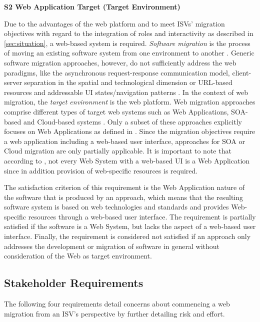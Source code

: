 \textbf{S2 Web Application Target (Target Environment)}

Due to the advantages of the web platform \autocite{Gitzel2007WebEngineeringMDD,Knorr2003WebAsPlatform} and to meet ISVs' migration objectives with regard to the integration of roles and interactivity as described in \cref{sec:situation}, a web-based system is required.
\emph{Software migration} is the process of moving an existing software system from one environment to another \autocite{SWEBOK2014}.
Generic software migration approaches, however, do not sufficiently address the web paradigms, like the asynchronous request-response communication model, client-server separation in the spatial and technological dimension or URL-based resources and addressable UI states/navigation patterns \autocite{Heil2017Survey}.
In the context of web migration, the \emph{target environment} is the web platform.
Web migration approaches comprise different types of target web systems \autocite[cf.~][]{def:websystem} such as Web Applications, SOA-based and Cloud-based systems \autocite{Heil2017Survey}.
Only a subset of these approaches explicitly focuses on Web Applications as defined in \autocite{def:webapplication}.
Since the migration objectives require a web application including a web-based user interface, approaches for SOA or Cloud migration are only partially applicable.
It is important to note that according to \autocite{def:webapplication}, not every Web System with a web-based UI is a Web Application since in addition provision of web-specific resources is required.

The satisfaction criterion of this requirement is the Web Application nature of the software that is produced by an approach, which means that the resulting software system is based on web technologies and standards and provides Web-specific resources through a web-based user interface.
The requirement is partially satisfied if the software is a Web System, but lacks the aspect of a web-based user interface.
Finally, the requirement is considered not satisfied if an approach only addresses the development or migration of software in general without consideration of the Web as target environment.

\hypertarget{stakeholder-requirements}{%
\subsection{Stakeholder Requirements}\label{stakeholder-requirements}}

The following four requirements detail concerns about commencing a web migration from an ISV's perspective by further detailing risk and effort.

